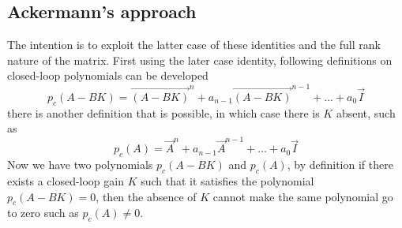 \subsection{Ackermann's approach}

The intention is to exploit the latter case of these identities and the full rank nature of the matrix. First using the later case identity, following definitions on closed-loop polynomials can be developed
\begin{equation}
	p_{c}(A - BK) = \vec{(A - BK)}^{n} + a_{n-1}\vec{(A - BK)}^{n-1} + ... + a_{0}\vec{I}
\end{equation}
there is another definition that is possible, in which case there is $K$ absent, such as
\begin{equation}
p_{c}(A) = \vec{A}^{n} + a_{n-1}\vec{A}^{n-1} + ... + a_{0}\vec{I}
\end{equation}
Now we have two polynomials $p_{c}(A - BK)$ and $p_{c}(A)$, by definition if there exists a closed-loop gain $K$ such that it satisfies the polynomial $p_{c}(A - BK) = 0$, then the absence of $K$ cannot make the same polynomial go to zero such as $p_{c}(A) \neq 0$.

